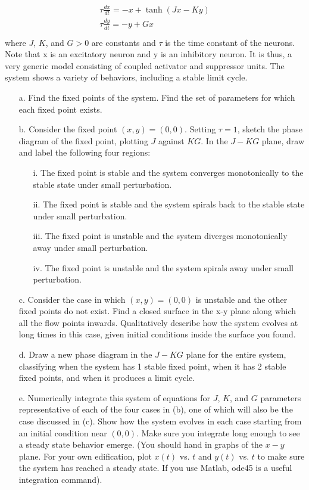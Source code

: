 \documentclass{article}
\begin{document}
\begin{eqnarray}
\begin{aligned}
\tau \frac{dx}{dt} = -x + \tanh(Jx - Ky)\\
\tau \frac{dy}{dt} = -y + Gx\\
\end{aligned}
\end{eqnarray}
where $J$, $K$, and $G >0$  are constants and $\tau$ is the time constant of the neurons. Note that x is an excitatory neuron and y is an inhibitory neuron. It is thus, a very generic model consisting of coupled activator and suppressor units. The system shows a variety of behaviors, including a stable limit cycle. 
\begin{enumerate}
\item[a.]	Find the fixed points of the system.  Find the set of parameters for which each fixed point exists.
\item[b.]	Consider the fixed point $(x,y) = (0,0)$.  Setting $\tau = 1$, sketch the phase diagram of the fixed point, plotting $J$ against $KG$.  In the $J-KG$ plane, draw and label the following four regions:
\begin{enumerate}
\item[i.]	The fixed point is stable and the system converges monotonically to the stable state under small perturbation.
\item[ii.]	The fixed point is stable and the system spirals back to the stable state under small perturbation.
\item[iii.]	The fixed point is unstable and the system diverges monotonically away under small perturbation.
\item[iv.]	The fixed point is unstable and the system spirals away under small perturbation.
\end{enumerate}
\item[c.]	Consider the case in which $(x,y) = (0,0)$ is unstable and the other fixed points do not exist. Find a closed surface in the x-y plane along which all the flow points inwards.  Qualitatively describe how the system evolves at long times in this case, given initial conditions inside the surface you found.
\item[d.]	Draw a new phase diagram in the $J-KG$ plane for the entire system, classifying when the system has 1 stable fixed point, when it has 2 stable fixed points, and when it produces a limit cycle.
\item[e.]	Numerically integrate this system of equations for $J$, $K$, and $G$ parameters representative of each of the four cases in (b), one of which will also be the case discussed in (c). Show how the system evolves in each case starting from an initial condition near $(0,0)$. Make sure you integrate long enough to see a steady state behavior emerge.  (You should hand in graphs of the $x-y$ plane.  For your own edification, plot $x(t)$ vs. $t$ and $y(t)$ vs. $t$ to make sure the system has reached a steady state.  If you use Matlab, ode45 is a useful integration command).

\end{enumerate}
\end{document}
